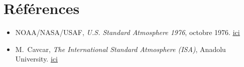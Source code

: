 \documentclass[a4paper,11pt]{article}
\begin{document}
\section*{Références}

\begin{itemize}
  \item NOAA/NASA/USAF, \emph{U.S. Standard Atmosphere 1976}, octobre 1976.
        \href{https://www.ngdc.noaa.gov/stp/space-weather/online-publications/miscellaneous/us-standard-atmosphere-1976/us-standard-atmosphere_st76-1562_noaa.pdf}{\underline{ici}}
  \item M.~Cavcar, \emph{The International Standard Atmosphere (ISA)},
        Anadolu University.
        \href{http://fisicaatmo.at.fcen.uba.ar/practicas/ISAweb.pdf}{\underline{ici}}

\end{itemize}
\end{document}
